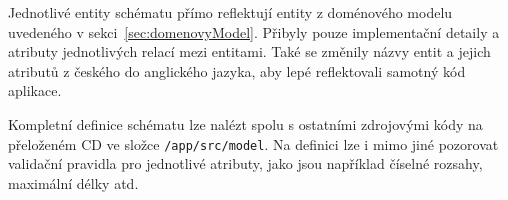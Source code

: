 Jednotlivé entity schématu přímo reflektují entity z doménového modelu uvedeného v sekci~\ref{sec:domenovyModel}.
Přibyly pouze implementační detaily a atributy jednotlivých relací mezi entitami.
Také se změnily názvy entit a jejich atributů z českého do anglického jazyka, aby lepé reflektovali samotný kód aplikace.

Kompletní definice schématu lze nalézt spolu s ostatními zdrojovými kódy na přeloženém CD ve složce \texttt{/app/src/model}.
Na definici lze i mimo jiné pozorovat validační pravidla pro jednotlivé atributy, jako jsou například číselné rozsahy, maximální délky atd.
